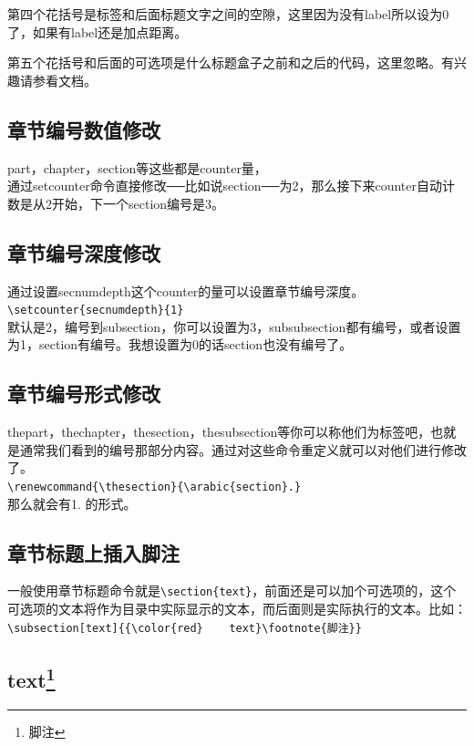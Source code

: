 \documentclass[11pt,oneside]{book}
\begin{document}
\begin{common-format}
第四个花括号是标签和后面标题文字之间的空隙，这里因为没有label所以设为0了，如果有label还是加点距离。

第五个花括号和后面的可选项是什么标题盒子之前和之后的代码，这里忽略。有兴趣请参看文档。


\subsection{章节编号数值修改}
part，chapter，section等这些都是counter量，\\通过setcounter命令直接修改──比如说section──为2，那么接下来counter自动计数是从2开始，下一个section编号是3。

\subsection{章节编号深度修改}
通过设置secnumdepth这个counter的量可以设置章节编号深度。\\
\verb+\setcounter{secnumdepth}{1} +\\
默认是2，编号到subsection，你可以设置为3，subsubsection都有编号，或者设置为1，section有编号。我想设置为0的话section也没有编号了。

\subsection{章节编号形式修改}
\label{sec:章节编号形式修改}
thepart，thechapter，thesection，thesubsection等你可以称他们为标签吧，也就是通常我们看到的编号那部分内容。通过对这些命令重定义就可以对他们进行修改了。\\
\verb+\renewcommand{\thesection}{\arabic{section}.}+\\
那么就会有1. 的形式。

\subsection{章节标题上插入脚注}
一般使用章节标题命令就是\verb+\section{text}+，前面还是可以加个可选项的，这个可选项的文本将作为目录中实际显示的文本，而后面则是实际执行的文本。比如：\\
\verb+\subsection[text]{{\color{red}    text}\footnote{脚注}}+
\subsection[text]{{\color{red}    text}\footnote{脚注}}



\end{common-format}
\end{document}

